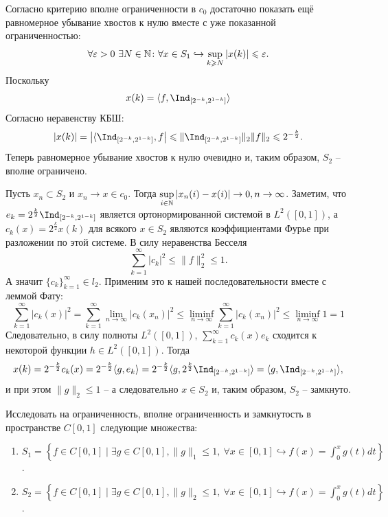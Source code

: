 \begin{solve}
\begin{enumerate}
        Согласно критерию вполне ограниченности в $c_0$ достаточно показать ещё равномерное убывание хвостов к нулю вместе с уже показанной ограниченностью:
        \[
            \forall \varepsilon > 0 \ \exists N \in \mathbb{N}\colon \forall x \in S_1 \hookrightarrow \sup\limits_{k \geqslant N} |x(k)| \leqslant \varepsilon.
        \]
        Поскольку
        \[
            x(k) = \langle f, \Ind_{[2^{-k}, 2^{1 - k}]}\rangle
        \]
        Согласно неравенству КБШ:
        \[
            |x(k)| = \left|\langle \Ind_{[2^{-k}, 2^{1-k}]}, f\right| \leq \|\Ind_{[2^{-k}, 2^{1-k}]}\|_2\|f\|_2 \leq 2^{-\frac{k}{2}}.
        \]
        Теперь равномерное убывание хвостов к нулю очевидно и, таким образом, $S_2$ -- вполне ограничено.

        Пусть $x_n \subset S_2$ и $x_n \rightarrow x \in c_0$. Тогда $\sup\limits_{i \in \mathbb{N}} |x_n(i) - x(i)| \rightarrow 0, n \rightarrow \infty$. Заметим, что $e_k = 2^{\frac{k}{2}}\Ind_{[2^{-k}, 2^{1-k}]}$ является ортонормированной системой в $L^2([0, 1])$, а $c_k(x) = 2^{\frac{k}{2}}x(k)$ для всякого $x \in S_2$ являются коэффициентами Фурье при разложении по этой системе. В силу неравенства Бесселя
        \[
            \sum_{k = 1}^{\infty} |c_k|^2 \leq \|f\|^2_2 \leq 1.
        \]
        А значит $\{c_k\}_{k = 1}^{\infty} \in l_2$. Применим это к нашей последовательности вместе с леммой Фату:
        \[
            \sum_{k = 1}^{\infty} |c_k(x)|^2 = \sum_{k = 1}^{\infty} \lim_{n \rightarrow \infty} |c_k(x_n)|^2 \leq \liminf_{n \rightarrow \infty} \sum_{k = 1}^{\infty} |c_k(x_n)|^2 \leq \liminf_{n \rightarrow \infty} 1 = 1
        \]
        Следовательно, в силу полноты $L^2([0, 1])$, $\sum_{k = 1}^{\infty} c_k(x)e_k$ сходится к некоторой функции $h \in L^2([0, 1])$. Тогда
        \[
            x(k) = 2^{-\frac{k}{2}}c_k(x) = 2^{-\frac{k}{2}}\langle g, e_k\rangle = 2^{-\frac{k}{2}} \langle g, 2^{\frac{k}{2}}\Ind_{[2^{-k}, 2^{1-k}]}\rangle = \langle g, \Ind_{[2^{-k}, 2^{1-k}]} \rangle,
        \]
        и при этом $\|g\|_2 \leq 1$ -- а следовательно $x \in S_2$ и, таким образом, $S_2$ -- замкнуто.
    \end{enumerate}
\end{solve}
\begin{task}[T12]
    Исследовать на ограниченность, вполне ограниченность и замкнутость в пространстве $C[0, 1]$ следующие множества:
    \begin{enumerate}
        \item $S_1 = \left\{f \in C[0 ,1] \mid \exists g \in C[0, 1], \|g\|_1 \leq 1, \ \forall x \in [0, 1] \hookrightarrow f(x) = \int_0^x g(t)dt\right\}$.
        \item $S_2 = \left\{f \in C[0 ,1] \mid \exists g \in C[0, 1], \|g\|_2 \leq 1, \ \forall x \in [0, 1] \hookrightarrow f(x) = \int_0^x g(t)dt\right\}$.
    \end{enumerate}
\end{task}
